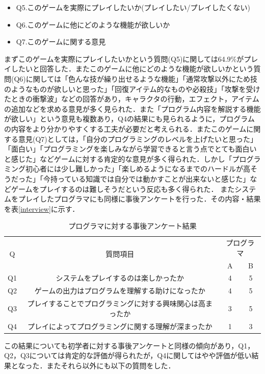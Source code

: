 \begin{itemize}
  \item Q5.このゲームを実際にプレイしたいか(プレイしたい/プレイしたくない)
  \item Q6.このゲームに他にどのような機能が欲しいか
  \item Q7.このゲームに関する意見
\end{itemize}

まずこのゲームを実際にプレイしたいかという質問(Q5)に関しては64.9\%がプレイしたいと回答した．またこのゲームに他にどのような機能が欲しいかという質問(Q6)に関しては「色んな技が繰り出せるような機能」「通常攻撃以外にため技のようなものが欲しいと思った」「回復アイテム的なものや必殺技」「攻撃を受けたときの衝撃波」などの回答があり，キャラクタの行動，エフェクト，アイテムの追加などを求める意見が多く見られた．また「プログラム内容を解説する機能が欲しい」という意見も複数あり，Q4の結果にも見られるように，プログラムの内容をより分かりやすくする工夫が必要だと考えられる．またこのゲームに関する意見(Q7)としては，「自分のプログラミングのレベルを上げたいと思った」「面白い」「プログラミングを楽しみながら学習できると言う点でとても面白いと感じた」などゲームに対する肯定的な意見が多く得られた．しかし「プログラミング初心者には少し難しかった」「楽しめるようになるまでのハードルが高そうだった」「今持っている知識では自分では動かすことが出来ないと感じた」などゲームをプレイするのは難しそうだという反応も多く得られた．
またシステムをプレイしたプログラマにも同様に事後アンケートを行った．その内容・結果を表\ref{interview}に示す．

\begin{table}[!ht]
  \centering
  \caption{プログラマに対する事後アンケート結果}
  \label{programmer_interview}
    \begin{tabular}{|c|c|c|c|} \hline
      \multirow{2}{*}{Q} & \multirow{2}{*}{質問項目} & \multicolumn{2}{c}{プログラマ} \\ 
        & &A&B\\ \hline\hline
      Q1 & システムをプレイするのは楽しかったか & 4 & 5 \\ \hline
      Q2 & ゲームの出力はプログラムを理解する助けになったか & 4 & 5\\ \hline
      Q3 & プレイすることでプログラミングに対する興味関心は高まったか & 3 & 5\\ \hline
      Q4 & プレイによってプログラミングに関する理解が深まったか & 1 & 3\\ \hline
    \end{tabular}
\end{table}
この結果についても初学者に対する事後アンケートと同様の傾向があり，Q1，Q2，Q3については肯定的な評価が得られたが，Q4に関してはやや評価が低い結果となった．またそれら以外にも以下の質問をした．

